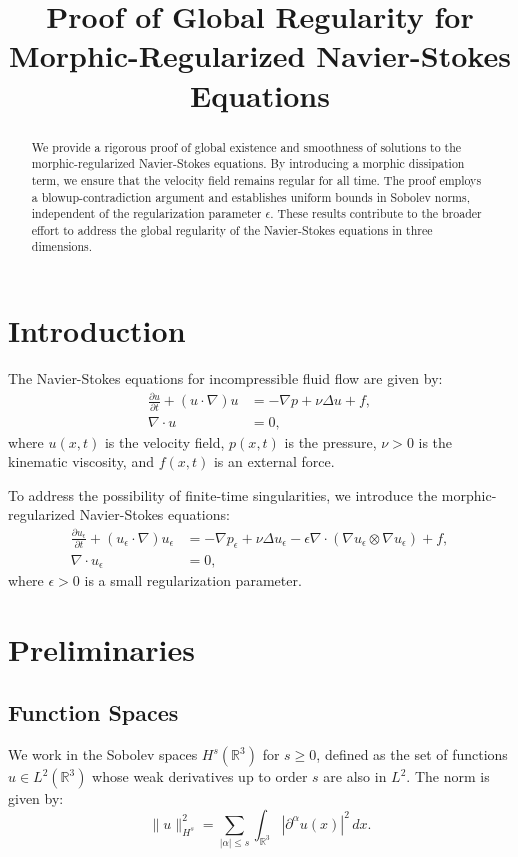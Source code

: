 \documentclass{article}
\title{Proof of Global Regularity for Morphic-Regularized Navier-Stokes Equations}
\author{}
\date{}
\begin{document}
\maketitle

\begin{abstract}
We provide a rigorous proof of global existence and smoothness of solutions to the morphic-regularized Navier-Stokes equations. By introducing a morphic dissipation term, we ensure that the velocity field remains regular for all time. The proof employs a blowup-contradiction argument and establishes uniform bounds in Sobolev norms, independent of the regularization parameter $\epsilon$. These results contribute to the broader effort to address the global regularity of the Navier-Stokes equations in three dimensions.
\end{abstract}

\section{Introduction}
The Navier-Stokes equations for incompressible fluid flow are given by:
\begin{align}
    \frac{\partial u}{\partial t} + (u \cdot \nabla)u &= -\nabla p + \nu \Delta u + f, \label{eq:navier_stokes} \\
    \nabla \cdot u &= 0, \label{eq:incompressibility}
\end{align}
where $u(x, t)$ is the velocity field, $p(x, t)$ is the pressure, $\nu > 0$ is the kinematic viscosity, and $f(x, t)$ is an external force.

To address the possibility of finite-time singularities, we introduce the morphic-regularized Navier-Stokes equations:
\begin{align}
    \frac{\partial u_\epsilon}{\partial t} + (u_\epsilon \cdot \nabla)u_\epsilon &= -\nabla p_\epsilon + \nu \Delta u_\epsilon - \epsilon \nabla \cdot (\nabla u_\epsilon \otimes \nabla u_\epsilon) + f, \label{eq:regularized_ns} \\
    \nabla \cdot u_\epsilon &= 0, \label{eq:regularized_incompressibility}
\end{align}
where $\epsilon > 0$ is a small regularization parameter.

\section{Preliminaries}

\subsection{Function Spaces}
We work in the Sobolev spaces $H^s(\mathbb{R}^3)$ for $s \geq 0$, defined as the set of functions $u \in L^2(\mathbb{R}^3)$ whose weak derivatives up to order $s$ are also in $L^2$. The norm is given by:
\[
    \|u\|_{H^s}^2 = \sum_{|\alpha| \leq s} \int_{\mathbb{R}^3} |\partial^\alpha u(x)|^2 \, dx.
\]
\end{document}
